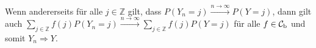 \documentclass{article}
\begin{document}
Wenn andererseits für alle $j\in\mathbb{Z}$ gilt, dass $P(Y_n=j)\xrightarrow{n\to\infty}P(Y=j)$, dann gilt auch $\sum_{j\in\mathbb{Z}}f(j)P(Y_n=j)\xrightarrow{n\to\infty}\sum_{j\in\mathbb{Z}}f(j)P(Y=j)$ für alle $f\in{\cal C}_\mathrm{b}$ und somit $Y_n\Rightarrow Y$.
\newpage


\end{document}
